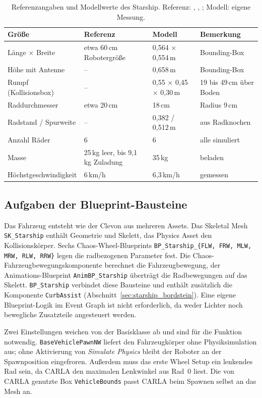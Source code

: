 \begin{table}[htbp]
  \centering
  \caption{Referenzangaben und Modellwerte des Starship. Referenz: \textcite{wikipedia_starship},
  \textcite{starship_patent_kamera}, \textcite{starship_patent_bogie}; Modell: eigene Messung.}
  \label{tab:starship_masse}
  \begin{tabular}{llll}
    \hline
    Größe & Referenz & Modell & Bemerkung \\
    \hline
    Länge $\times$ Breite & etwa 60\,cm Robotergröße & 0,564 $\times$ 0,554\,m & Bounding-Box \\
    Höhe mit Antenne & -- & 0,658\,m & Bounding-Box \\
    Rumpf (Kollisionsbox) & -- & 0,55 $\times$ 0,45 $\times$ 0,30\,m & 19 bis 49\,cm über Boden \\
    Raddurchmesser & etwa 20\,cm & 18\,cm & Radius 9\,cm \\
    Radstand / Spurweite & -- & 0,382 / 0,512\,m & aus Radknochen \\
    Anzahl Räder & 6 & 6 & alle simuliert \\
    Masse & 25\,kg leer, bis 9,1\,kg Zuladung & 35\,kg & beladen \\
    Höchstgeschwindigkeit & 6\,km/h & 6,3\,km/h & gemessen \\
    \hline
  \end{tabular}
\end{table}

\subsection{Aufgaben der Blueprint-Bausteine}
\label{sec:starship_bausteine}

Das Fahrzeug entsteht wie der Clevon aus mehreren Assets. Das Skeletal Mesh
\texttt{SK\_Starship} enthält Geometrie und Skelett, das Physics Asset den
Kollisionskörper. Sechs Chaos-Wheel-Blueprints \texttt{BP\_Starship\_\{FLW, FRW, MLW,
MRW, RLW, RRW\}} legen die radbezogenen Parameter fest. Die Chaos-Fahrzeugbewegungs\-komponente
berechnet die Fahrzeugbewegung, der Animations-Blueprint \texttt{AnimBP\_Starship}
überträgt die Radbewegungen auf das Skelett. \texttt{BP\_Starship} verbindet diese
Bausteine und enthält zusätzlich die Komponente \texttt{CurbAssist}
(Abschnitt~\ref{sec:starship_bordstein}). Eine eigene Blueprint-Logik im Event Graph ist
nicht erforderlich, da weder Lichter noch bewegliche Zusatzteile angesteuert werden.

Zwei Einstellungen weichen von der Basisklasse ab und sind für die Funktion notwendig.
\texttt{BaseVehiclePawnNW} liefert den Fahrzeugkörper ohne Physiksimulation aus;
ohne Aktivierung von \emph{Simulate Physics} bleibt der Roboter an der Spawnposition
eingefroren. Außerdem muss das erste Wheel Setup ein lenkendes Rad sein, da CARLA den
maximalen Lenkwinkel aus Rad~0 liest. Die von CARLA genutzte Box
\texttt{VehicleBounds} passt CARLA beim Spawnen selbst an das Mesh an.


